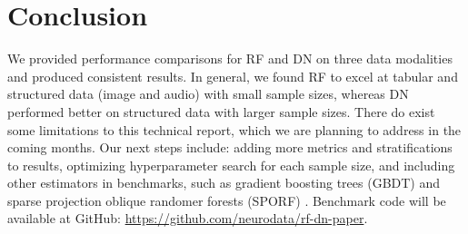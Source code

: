 \section{Conclusion}
\label{conclusion}
We provided performance comparisons for RF and DN on three data modalities and produced consistent results. In general, we found RF to excel at tabular and structured data (image and audio) with small sample sizes, whereas DN performed better on structured data with larger sample sizes. There do exist some limitations to this technical report, which we are planning to address in the coming months. Our next steps include: adding more metrics and stratifications to results, optimizing hyperparameter search for each sample size, and including other estimators in benchmarks, such as gradient boosting trees (GBDT) and sparse projection oblique randomer forests (SPORF) \citep{gbdt, sporf}. Benchmark code will be available at GitHub: \url{https://github.com/neurodata/rf-dn-paper}.

